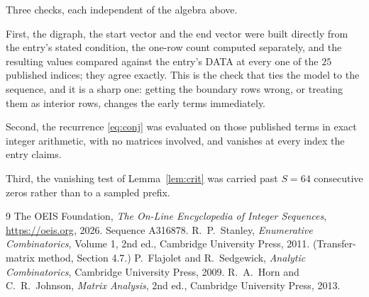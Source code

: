 \documentclass[11pt,a4paper]{article}
\theoremstyle{plain}
\theoremstyle{definition}
\begin{document}
Three checks, each independent of the algebra above.

First, the digraph, the start vector and the end vector were built directly from the
entry's stated condition, the one-row count computed separately, and the resulting values
compared against the entry's DATA at every one of the $25$ published indices; they
agree exactly. This is the check that ties the model to the sequence, and it is a sharp one:
getting the boundary rows wrong, or treating them as interior rows, changes the early terms
immediately.

Second, the recurrence \eqref{eq:conj} was evaluated on those published terms in exact
integer arithmetic, with no matrices involved, and vanishes at every index the entry claims.

Third, the vanishing test of Lemma~\ref{lem:crit} was carried past $S=64$ consecutive
zeros rather than to a sampled prefix.

\begin{thebibliography}{9}
 The OEIS Foundation, \emph{The On-Line Encyclopedia of Integer
Sequences}, \url{https://oeis.org}, 2026. Sequence A316878.
 R.~P.~Stanley, \emph{Enumerative Combinatorics}, Volume 1, 2nd ed.,
Cambridge University Press, 2011. (Transfer-matrix method, Section 4.7.)
 P.~Flajolet and R.~Sedgewick, \emph{Analytic Combinatorics}, Cambridge
University Press, 2009.
 R.~A.~Horn and C.~R.~Johnson, \emph{Matrix Analysis}, 2nd ed., Cambridge
University Press, 2013.
\end{thebibliography}
\end{document}
